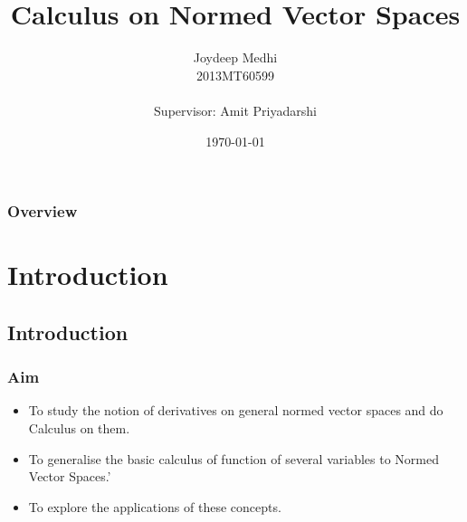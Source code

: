 \documentclass{beamer}
\title[Calculus on Norm]{Calculus on Normed Vector Spaces} %
\author[Joydeep]{Joydeep Medhi\\{\scriptsize 2013MT60599 \\~\\ \scriptsize Supervisor: Amit Priyadarshi}} %
\institute[IIT Delhi] %
{
Dept. of Mathematics \\
Indian Institute of Technology\\ %
\medskip
\textit{} %
Mid-Term Presentation
}
\date{\today} %
\begin{document}
\begin{frame}
\titlepage %
\end{frame}

\begin{frame}
\frametitle{Overview} %
\tableofcontents %
\end{frame}


\section{Introduction} %

\subsection{Introduction} %

\begin{frame}
\frametitle{Aim}
\begin{itemize}
\item To study the notion of derivatives on general normed vector spaces and do Calculus on them.
\item To generalise the basic calculus of function of several variables to Normed Vector Spaces.'
\item To explore the applications of these concepts.
\end{itemize}
\end{frame}
\end{document}
